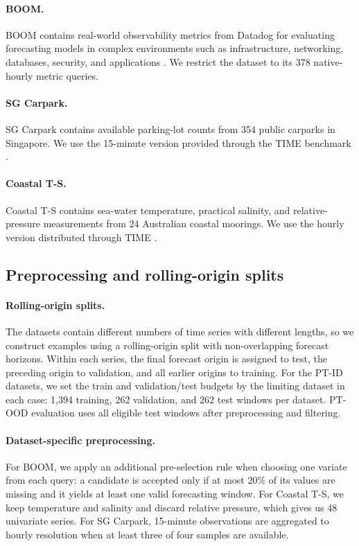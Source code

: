 \documentclass{article}
\begin{document}
\paragraph{BOOM.}
BOOM contains real-world observability metrics from Datadog for evaluating forecasting models in complex environments such as infrastructure, networking, databases, security, and applications \citep{cohen2025timedifferentobservabilityperspective}. We restrict the dataset to its 378 native-hourly metric queries.

\paragraph{SG Carpark.}
SG Carpark contains available parking-lot counts from 354 public carparks in Singapore. We use the 15-minute version provided through the TIME benchmark \citep{qiao2026itstimegenerationtime}.

\paragraph{Coastal T-S.}
Coastal T-S contains sea-water temperature, practical salinity, and relative-pressure measurements from 24 Australian coastal moorings. We use the hourly version distributed through TIME \citep{qiao2026itstimegenerationtime}.


\subsection{Preprocessing and rolling-origin splits}
\label{apndx:data-splits}

\paragraph{Rolling-origin splits.}
The datasets contain different numbers of time series with different lengths, so we construct examples using a rolling-origin split with non-overlapping forecast horizons. Within each series, the final forecast origin is assigned to test, the preceding origin to validation, and all earlier origins to training. For the PT-ID datasets, we set the train and validation/test budgets by the limiting dataset in each case: 1,394 training, 262 validation, and 262 test windows per dataset. PT-OOD evaluation uses all eligible test windows after preprocessing and filtering.

\paragraph{Dataset-specific preprocessing.}
For BOOM, we apply an additional pre-selection rule when choosing one variate from each query: a candidate is accepted only if at most \(20\%\) of its values are missing and it yields at least one valid forecasting window. For Coastal T-S, we keep temperature and salinity and discard relative pressure, which gives us 48 univariate series. For SG Carpark, 15-minute observations are aggregated to hourly resolution when at least three of four samples are available.  
\end{document}
